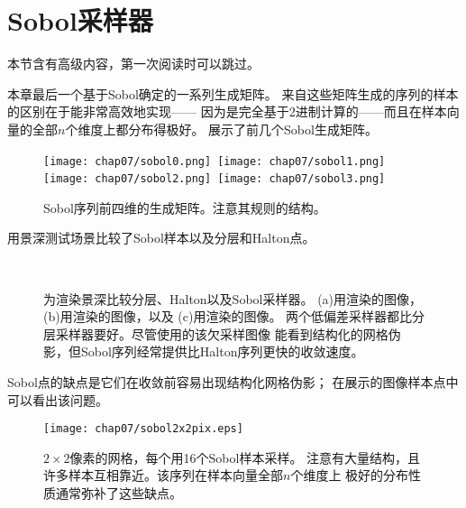 \section{Sobol采样器}\label{sec:Sobol采样器}
\begin{remark}
    本节含有高级内容，第一次阅读时可以跳过。
\end{remark}

本章最后一个基于Sobol确定的一系列生成矩阵。
来自这些矩阵生成的序列的样本的区别在于能非常高效地实现——
因为是完全基于2进制计算的——而且在样本向量的全部$n$个维度上都分布得极好。
展示了前几个Sobol生成矩阵。
\begin{figure}[htbp]
    \centering
    \texttt{[image: chap07/sobol0.png]}\,
    \texttt{[image: chap07/sobol1.png]}\,
    \texttt{[image: chap07/sobol2.png]}\,
    \texttt{[image: chap07/sobol3.png]}
    \caption{Sobol序列前四维的生成矩阵。注意其规则的结构。}
    \label{fig:7.34}
\end{figure}

用景深测试场景比较了Sobol样本以及分层和Halton点。
\begin{figure}[htbp]
    \,
    \\
    \caption{为渲染景深比较分层、Halton以及Sobol采样器。
        (a)用渲染的图像，
        (b)用渲染的图像，以及
        (c)用渲染的图像。
        两个低偏差采样器都比分层采样器要好。尽管使用的该欠采样图像
        能看到结构化的网格伪影，但Sobol序列经常提供比Halton序列更快的收敛速度。}
    \label{fig:7.35}
\end{figure}

Sobol点的缺点是它们在收敛前容易出现结构化网格伪影；
在展示的图像样本点中可以看出该问题。
\begin{figure}[htbp]
    \centering\texttt{[image: chap07/sobol2x2pix.eps]}
    \caption{$2\times2$像素的网格，每个用16个Sobol样本采样。
        注意有大量结构，且许多样本互相靠近。该序列在样本向量全部$n$个维度上
        极好的分布性质通常弥补了这些缺点。}
    \label{fig:7.36}
\end{figure}

